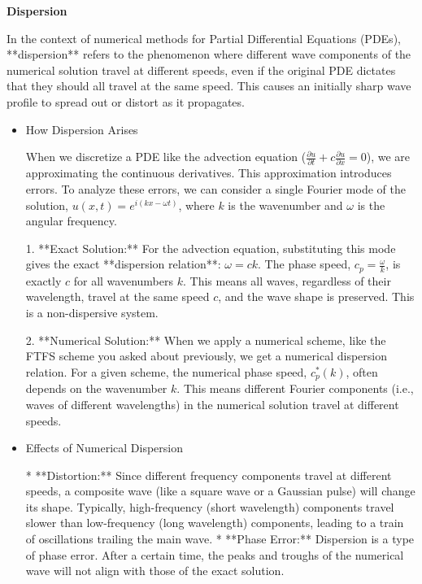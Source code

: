 \documentclass[12pt,a4paper]{report}
\begin{document}
\newpage
\begin{center}
	\textbf{\LARGE{Dispersion}}
\end{center}

In the context of numerical methods for Partial Differential Equations (PDEs), **dispersion** refers to the phenomenon where different wave components of the numerical solution travel at different speeds, even if the original PDE dictates that they should all travel at the same speed. This causes an initially sharp wave profile to spread out or distort as it propagates.

\begin{itemize}

\item  How Dispersion Arises

When we discretize a PDE like the advection equation (\(\frac{\partial u}{\partial t} + c \frac{\partial u}{\partial x} = 0\)), we are approximating the continuous derivatives. This approximation introduces errors. To analyze these errors, we can consider a single Fourier mode of the solution, \(u(x,t) = e^{i(kx - \omega t)}\), where \(k\) is the wavenumber and \(\omega\) is the angular frequency.

1.  **Exact Solution:** For the advection equation, substituting this mode gives the exact **dispersion relation**: \(\omega = ck\). The phase speed, \(c_p = \frac{\omega}{k}\), is exactly \(c\) for all wavenumbers \(k\). This means all waves, regardless of their wavelength, travel at the same speed \(c\), and the wave shape is preserved. This is a non-dispersive system.

2.  **Numerical Solution:** When we apply a numerical scheme, like the FTFS scheme you asked about previously, we get a numerical dispersion relation. For a given scheme, the numerical phase speed, \(c_p^*(k)\), often depends on the wavenumber \(k\). This means different Fourier components (i.e., waves of different wavelengths) in the numerical solution travel at different speeds.

\item  Effects of Numerical Dispersion

*   **Distortion:** Since different frequency components travel at different speeds, a composite wave (like a square wave or a Gaussian pulse) will change its shape. Typically, high-frequency (short wavelength) components travel slower than low-frequency (long wavelength) components, leading to a train of oscillations trailing the main wave.
*   **Phase Error:** Dispersion is a type of phase error. After a certain time, the peaks and troughs of the numerical wave will not align with those of the exact solution.


\end{itemize}
\end{document}
